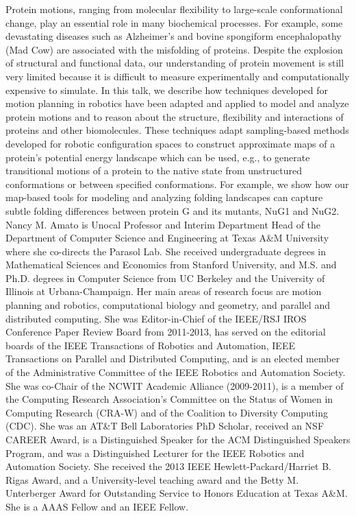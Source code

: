 {
Protein motions, ranging from molecular flexibility to large-scale conformational change, play an essential role in many biochemical processes. For example, some devastating diseases such as Alzheimer's and bovine spongiform encephalopathy (Mad Cow) are associated with the misfolding of proteins. Despite the explosion of structural and functional data, our understanding of protein movement is still very limited because it is difficult to measure experimentally and computationally expensive to simulate. In this talk, we describe how techniques developed for motion planning in robotics have been adapted and applied to model and analyze protein motions and to reason about the structure, flexibility and interactions of proteins and other biomolecules. These techniques adapt sampling-based methods developed for robotic configuration spaces to construct approximate maps of a protein's potential energy landscape which can be used, e.g., to generate transitional motions of a protein to the native state from unstructured conformations or between specified conformations. For example, we show how our map-based tools for modeling and analyzing folding landscapes can capture subtle folding differences between protein G and its mutants, NuG1 and NuG2.
}{
Nancy M. Amato is Unocal Professor and Interim Department Head of the Department of Computer Science and Engineering at Texas A\&M University where she co-directs the Parasol Lab. She received undergraduate degrees in Mathematical Sciences and Economics from Stanford University, and M.S. and Ph.D. degrees in Computer Science from UC Berkeley and the University of Illinois at Urbana-Champaign. Her main areas of research focus are motion planning and robotics, computational biology and geometry, and parallel and distributed computing. She was Editor-in-Chief of the IEEE/RSJ IROS Conference Paper Review Board from 2011-2013, has served on the editorial boards of the IEEE Transactions of Robotics and Automation, IEEE Transactions on Parallel and Distributed Computing, and is an elected member of the Administrative Committee of the IEEE Robotics and Automation Society. She was co-Chair of the NCWIT Academic Alliance (2009-2011), is a member of the Computing Research Association's Committee on the Status of Women in Computing Research (CRA-W) and of the Coalition to Diversity Computing (CDC). She was an AT\&T Bell Laboratories PhD Scholar, received an NSF CAREER Award, is a Distinguished Speaker for the ACM Distinguished Speakers Program, and was a Distinguished Lecturer for the IEEE Robotics and Automation Society. She received the 2013 IEEE Hewlett-Packard/Harriet B. Rigas Award, and a University-level teaching award and the Betty M. Unterberger Award for Outstanding Service to Honors Education at Texas A\&M. She is a AAAS Fellow and an IEEE Fellow.
}
